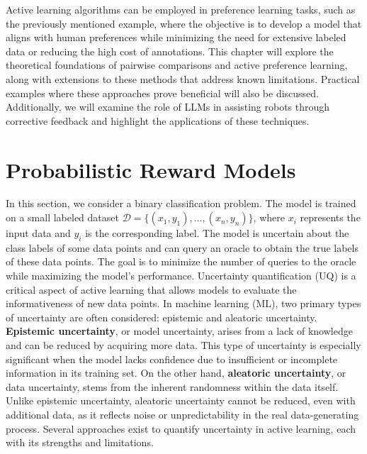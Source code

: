 \documentclass[
  letterpaper,
  numbers=noenddot,
  DIV=11]{scrreprt}
\theoremstyle{definition}
\theoremstyle{plain}
\theoremstyle{plain}
\theoremstyle{remark}
\begin{document}
Active learning algorithms can be employed in preference learning tasks,
such as the previously mentioned example, where the objective is to
develop a model that aligns with human preferences while minimizing the
need for extensive labeled data or reducing the high cost of
annotations. This chapter will explore the theoretical foundations of
pairwise comparisons and active preference learning, along with
extensions to these methods that address known limitations. Practical
examples where these approaches prove beneficial will also be discussed.
Additionally, we will examine the role of LLMs in assisting robots
through corrective feedback and highlight the applications of these
techniques.

\section{Probabilistic Reward Models}\label{probabilistic-reward-models}

In this section, we consider a binary classification problem. The model
is trained on a small labeled dataset
\(\mathcal{D} = \{(x_1, y_1), \ldots, (x_n, y_n)\}\), where \(x_i\)
represents the input data and \(y_i\) is the corresponding label. The
model is uncertain about the class labels of some data points and can
query an oracle to obtain the true labels of these data points. The goal
is to minimize the number of queries to the oracle while maximizing the
model's performance. Uncertainty quantification (UQ) is a critical
aspect of active learning that allows models to evaluate the
informativeness of new data points. In machine learning (ML), two
primary types of uncertainty are often considered: epistemic and
aleatoric uncertainty. \textbf{Epistemic uncertainty}, or model
uncertainty, arises from a lack of knowledge and can be reduced by
acquiring more data. This type of uncertainty is especially significant
when the model lacks confidence due to insufficient or incomplete
information in its training set. On the other hand, \textbf{aleatoric
uncertainty}, or data uncertainty, stems from the inherent randomness
within the data itself. Unlike epistemic uncertainty, aleatoric
uncertainty cannot be reduced, even with additional data, as it reflects
noise or unpredictability in the real data-generating process. Several
approaches exist to quantify uncertainty in active learning, each with
its strengths and limitations.
\end{document}
